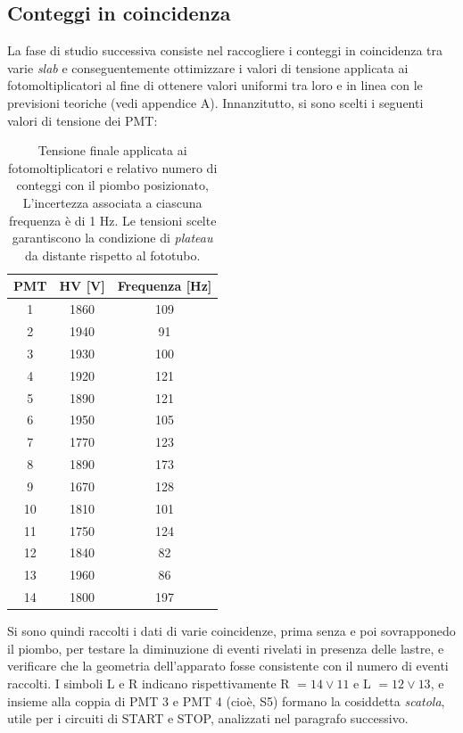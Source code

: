 \documentclass[10pt, oneside, a4paper]{article}   	%
\begin{document}
\subsection{Conteggi in coincidenza}
La fase di studio successiva consiste nel raccogliere i conteggi in coincidenza tra varie \emph{slab} e conseguentemente ottimizzare i valori di tensione applicata ai fotomoltiplicatori al fine di ottenere valori uniformi tra loro e in linea con le previsioni teoriche (vedi appendice A). 
Innanzitutto, si sono scelti i seguenti valori di tensione dei PMT: 
\begin{table}[h]
		\centering
	\begin{tabular}{ccc}
		\toprule
		PMT	&	HV [V]	&	Frequenza [Hz]\\	
		\midrule
		1	&	1860	&	109	\\
		2	&	1940	&	91	\\
		3	&	1930	&	100	\\
		4	&	1920	&	121	\\
		5	&	1890	&	121	\\
		6	&	1950	&	105	\\
		7	&	1770	&	123	\\
		8	&	1890	&	173	\\
		9	&	1670	&	128	\\
		10	&	1810	&	101	\\
		11	&	1750	&	124	\\
		12	&	1840	&	82	\\
		13	&	1960	&	86	\\
		14	&	1800	&	197	\\
		\bottomrule
	\end{tabular}
	\caption{Tensione finale applicata ai fotomoltiplicatori e relativo numero di conteggi con il piombo posizionato, L'incertezza associata a ciascuna frequenza è di 1 Hz. Le tensioni scelte garantiscono la condizione di \emph{plateau} da distante rispetto al fototubo.}
	\label{HV_counts}
\end{table}
Si sono quindi raccolti i dati di varie coincidenze, prima senza e poi sovrapponedo il piombo, per testare la diminuzione di eventi rivelati in presenza delle lastre, e verificare che la geometria dell'apparato fosse consistente con il numero di eventi raccolti. I simboli L e R indicano rispettivamente R $= 14 \vee 11 $ e L $= 12 \vee 13$, e insieme alla coppia di PMT 3 e PMT 4 (cioè, S5) formano la cosiddetta \emph{scatola}, utile per i circuiti di START e STOP, analizzati nel paragrafo successivo.
%
\end{document}
